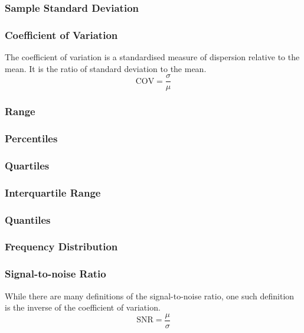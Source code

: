 \documentclass[11pt]{report} %
\begin{document}
\subsubsection{Sample Standard Deviation}

\subsubsection{Coefficient of Variation}

The coefficient of variation is a standardised measure of dispersion relative to the mean. It is the ratio of standard deviation to the mean.
\begin{equation}
\mathrm{COV} = \dfrac{\sigma}{\mu}
\end{equation}

\subsubsection{Range}

\subsubsection{Percentiles}

\subsubsection{Quartiles}

\subsubsection{Interquartile Range}

\subsubsection{Quantiles}

\subsubsection{Frequency Distribution}

\subsubsection{Signal-to-noise Ratio}

While there are many definitions of the signal-to-noise ratio, one such definition is the inverse of the coefficient of variation.
\begin{equation}
\mathrm{SNR} = \dfrac{\mu}{\sigma}
\end{equation}
\end{document}
